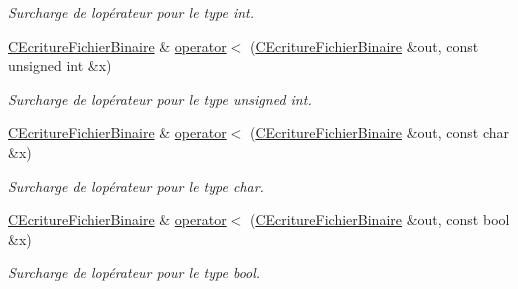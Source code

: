 \begin{DoxyCompactItemize}
\begin{DoxyCompactList}\small\item\em Surcharge de l\textquotesingle{}opérateur pour le type {\itshape int}. \end{DoxyCompactList}\item 
\hypertarget{class_c_ecriture_fichier_binaire_a38d0f050dcc8a79522b0fb9b9c591f72}{}\hyperlink{class_c_ecriture_fichier_binaire}{C\+Ecriture\+Fichier\+Binaire} \& \hyperlink{class_c_ecriture_fichier_binaire_a38d0f050dcc8a79522b0fb9b9c591f72}{operator$<$} (\hyperlink{class_c_ecriture_fichier_binaire}{C\+Ecriture\+Fichier\+Binaire} \&out, const unsigned int \&x)\label{class_c_ecriture_fichier_binaire_a38d0f050dcc8a79522b0fb9b9c591f72}

\begin{DoxyCompactList}\small\item\em Surcharge de l\textquotesingle{}opérateur pour le type {\itshape unsigned} {\itshape int}. \end{DoxyCompactList}\item 
\hypertarget{class_c_ecriture_fichier_binaire_a3cb25116e2558d967dfd21e812e47a3e}{}\hyperlink{class_c_ecriture_fichier_binaire}{C\+Ecriture\+Fichier\+Binaire} \& \hyperlink{class_c_ecriture_fichier_binaire_a3cb25116e2558d967dfd21e812e47a3e}{operator$<$} (\hyperlink{class_c_ecriture_fichier_binaire}{C\+Ecriture\+Fichier\+Binaire} \&out, const char \&x)\label{class_c_ecriture_fichier_binaire_a3cb25116e2558d967dfd21e812e47a3e}

\begin{DoxyCompactList}\small\item\em Surcharge de l\textquotesingle{}opérateur pour le type {\itshape char}. \end{DoxyCompactList}\item 
\hypertarget{class_c_ecriture_fichier_binaire_a37080aca11f391be69941db70093f77d}{}\hyperlink{class_c_ecriture_fichier_binaire}{C\+Ecriture\+Fichier\+Binaire} \& \hyperlink{class_c_ecriture_fichier_binaire_a37080aca11f391be69941db70093f77d}{operator$<$} (\hyperlink{class_c_ecriture_fichier_binaire}{C\+Ecriture\+Fichier\+Binaire} \&out, const bool \&x)\label{class_c_ecriture_fichier_binaire_a37080aca11f391be69941db70093f77d}

\begin{DoxyCompactList}\small\item\em Surcharge de l\textquotesingle{}opérateur pour le type {\itshape bool}. \end{DoxyCompactList}\end{DoxyCompactItemize}



